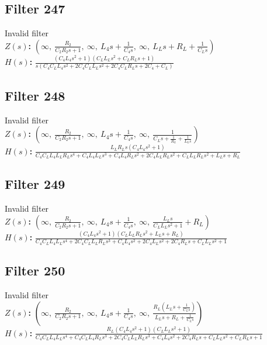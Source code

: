 \documentclass{article}
\begin{document}
\subsection*{Filter 247}
Invalid filter \\ 
\textbf{$Z(s)$:} $\left( \infty, \  \frac{R_{2}}{C_{2} R_{2} s + 1}, \  \infty, \  L_{4} s + \frac{1}{C_{4} s}, \  \infty, \  L_{L} s + R_{L} + \frac{1}{C_{L} s}\right)$ \\ 
\textbf{$H(s)$:} $\frac{\left(C_{4} L_{4} s^{2} + 1\right) \left(C_{L} L_{L} s^{2} + C_{L} R_{L} s + 1\right)}{s \left(C_{4} C_{L} L_{4} s^{2} + 2 C_{4} C_{L} L_{L} s^{2} + 2 C_{4} C_{L} R_{L} s + 2 C_{4} + C_{L}\right)}$ \\ 
\subsection*{Filter 248}
Invalid filter \\ 
\textbf{$Z(s)$:} $\left( \infty, \  \frac{R_{2}}{C_{2} R_{2} s + 1}, \  \infty, \  L_{4} s + \frac{1}{C_{4} s}, \  \infty, \  \frac{1}{C_{L} s + \frac{1}{R_{L}} + \frac{1}{L_{L} s}}\right)$ \\ 
\textbf{$H(s)$:} $\frac{L_{L} R_{L} s \left(C_{4} L_{4} s^{2} + 1\right)}{C_{4} C_{L} L_{4} L_{L} R_{L} s^{4} + C_{4} L_{4} L_{L} s^{3} + C_{4} L_{4} R_{L} s^{2} + 2 C_{4} L_{L} R_{L} s^{2} + C_{L} L_{L} R_{L} s^{2} + L_{L} s + R_{L}}$ \\ 
\subsection*{Filter 249}
Invalid filter \\ 
\textbf{$Z(s)$:} $\left( \infty, \  \frac{R_{2}}{C_{2} R_{2} s + 1}, \  \infty, \  L_{4} s + \frac{1}{C_{4} s}, \  \infty, \  \frac{L_{L} s}{C_{L} L_{L} s^{2} + 1} + R_{L}\right)$ \\ 
\textbf{$H(s)$:} $\frac{\left(C_{4} L_{4} s^{2} + 1\right) \left(C_{L} L_{L} R_{L} s^{2} + L_{L} s + R_{L}\right)}{C_{4} C_{L} L_{4} L_{L} s^{4} + 2 C_{4} C_{L} L_{L} R_{L} s^{3} + C_{4} L_{4} s^{2} + 2 C_{4} L_{L} s^{2} + 2 C_{4} R_{L} s + C_{L} L_{L} s^{2} + 1}$ \\ 
\subsection*{Filter 250}
Invalid filter \\ 
\textbf{$Z(s)$:} $\left( \infty, \  \frac{R_{2}}{C_{2} R_{2} s + 1}, \  \infty, \  L_{4} s + \frac{1}{C_{4} s}, \  \infty, \  \frac{R_{L} \left(L_{L} s + \frac{1}{C_{L} s}\right)}{L_{L} s + R_{L} + \frac{1}{C_{L} s}}\right)$ \\ 
\textbf{$H(s)$:} $\frac{R_{L} \left(C_{4} L_{4} s^{2} + 1\right) \left(C_{L} L_{L} s^{2} + 1\right)}{C_{4} C_{L} L_{4} L_{L} s^{4} + C_{4} C_{L} L_{4} R_{L} s^{3} + 2 C_{4} C_{L} L_{L} R_{L} s^{3} + C_{4} L_{4} s^{2} + 2 C_{4} R_{L} s + C_{L} L_{L} s^{2} + C_{L} R_{L} s + 1}$ \\ 
\end{document}
